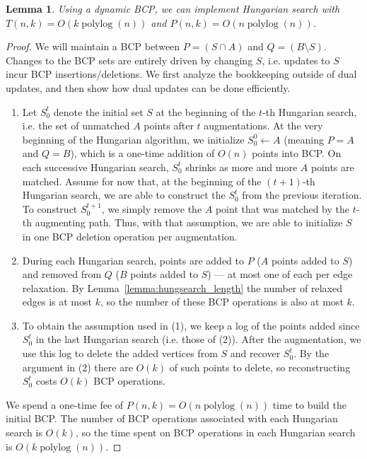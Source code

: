 \documentclass[11pt]{article}
\def\polylog{\mathop{\mathrm{polylog}}}
\theoremstyle{plain}
\newtheorem{lemma}{Lemma}
\begin{document}
\begin{lemma}
\label{lemma:hs_time}
	Using a dynamic BCP, we can implement Hungarian search with
	$T(n, k) = O(k\polylog(n))$ and $P(n, k) = O(n\polylog(n))$.
\end{lemma}
\begin{proof}
	We will maintain a BCP between $P = (S \cap A)$ and
	$Q = (B \setminus S)$.
	Changes to the BCP sets are entirely driven by changing $S$,
	i.e. updates to $S$ incur BCP insertions/deletions.
	We first analyze the bookkeeping outside of dual updates, and then
	show how dual updates can be done efficiently.

	\begin{enumerate}
	\item Let $S^t_0$ denote the initial set $S$ at the beginning of the
		$t$-th Hungarian search, i.e. the set of unmatched $A$ points
		after $t$ augmentations.
		At the very beginning of the Hungarian algorithm, we initialize
		$S^0_0 \gets A$ (meaning $P = A$ and $Q = B$), which is a
		one-time addition of $O(n)$ points into BCP.
		On each successive Hungarian search, $S^t_0$ shrinks as more
		and more $A$ points are matched.
		Assume for now that, at the beginning of the $(t+1)$-th
		Hungarian search, we are able to construct the $S^t_0$ from the
		previous iteration.
		To construct $S^{t+1}_0$, we simply remove the $A$ point that
		was matched by the $t$-th augmenting path.
		Thus, with that assumption, we are able to initialize $S$ in
		one BCP deletion operation per augmentation.

	\item During each Hungarian search, points are added to $P$ ($A$ points
		added to $S$) and removed from $Q$ ($B$ points added to $S$)
		--- at most one of each per edge relaxation.
		By Lemma~\ref{lemma:hungsearch_length} the number of relaxed
		edges is at most $k$, so the number of these BCP operations is
		also at most $k$.

	\item To obtain the assumption used in (1), we keep a log of the
		points added since $S^t_0$ in the last Hungarian search
		(i.e. those of (2)).
		After the augmentation, we use this log to delete the added
		vertices from $S$ and recover $S^t_0$.
		By the argument in (2) there are $O(k)$ of such points to
		delete, so reconstructing $S^t_0$ costs $O(k)$ BCP operations.
	\end{enumerate}

	We spend a one-time fee of $P(n, k) = O(n \polylog(n))$ time to build
	the initial BCP.
	The number of BCP operations associated with each Hungarian search is
	$O(k)$, so the time spent on BCP operations in each Hungarian search
	is $O(k \polylog(n))$.


\end{proof}
\end{document}
